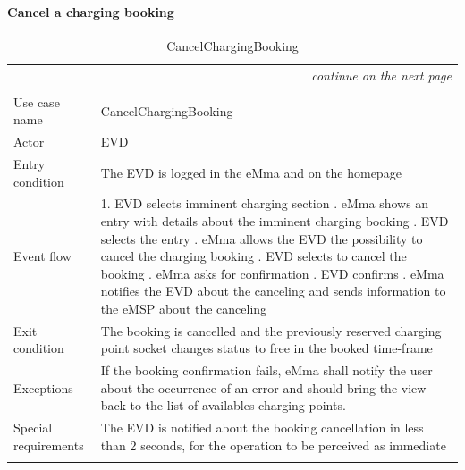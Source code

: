 \paragraph{Cancel a charging booking}
\begin{center}
    \begin{longtable}{p{4cm} p{11cm}}
    \multicolumn{2}{r}{\itshape{continue on the next page}}\\
    \endfoot 
    \\
    \endlastfoot
    \hline
     Use case name &  CancelChargingBooking\\
     \hline
     Actor & EVD \\
     \hline
     Entry condition &   The EVD is logged in the eMma and on the homepage\\
     \hline
     Event flow &
        1. EVD selects imminent charging section \newline
        2. eMma shows an entry with details about the imminent charging booking \newline
        3. EVD selects the entry \newline
        4. eMma allows the EVD the possibility to cancel the charging booking \newline
        5. EVD selects to cancel the booking \newline
        6. eMma asks for confirmation \newline
        7. EVD confirms \newline
        8. eMma notifies the EVD about the canceling and sends information to the eMSP about the canceling\\
     \hline
     Exit condition &  The booking is cancelled and the previously reserved charging point socket changes status to free in the booked time-frame\\
     \hline
     Exceptions &
        If the booking confirmation fails, eMma shall notify the user about the occurrence of an error and should bring the view back to the list of availables charging points.
     \\
     \hline
     Special requirements & 
        The EVD is notified about the booking cancellation in less than 2 seconds, for the operation to be perceived as immediate\\
     \hline
    \caption{CancelChargingBooking}
    \label{tab:CancelChargingBooking}
    \end{longtable}
\end{center}

